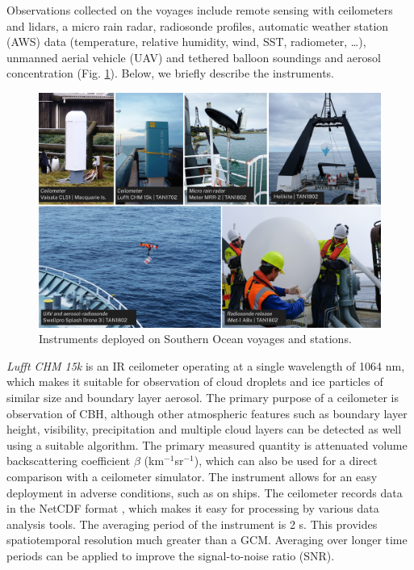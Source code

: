 Observations collected on the voyages include remote sensing with ceilometers and lidars,
a micro rain radar, radiosonde profiles, automatic weather station (AWS) data (temperature, relative humidity,
wind, SST, radiometer, \ldots), unmanned aerial vehicle (UAV) and tethered balloon soundings and
aerosol concentration (Fig. \ref{fig:1:instruments}).
Below, we briefly describe the instruments.

\begin{figure}[t]
\centering
\includegraphics[width=\textwidth]{fig/instruments.jpg}
\caption{
Instruments deployed on Southern Ocean voyages and stations.
}
\label{fig:1:instruments}
\end{figure}

\textit{Lufft CHM 15k} is an IR ceilometer operating at a single wavelength of
1064 nm, which makes it suitable for observation of cloud droplets and
ice particles of similar size and boundary layer aerosol.
The primary purpose of a ceilometer
is observation of CBH, although other atmospheric features
such as boundary layer height, visibility, precipitation and multiple
cloud layers can be detected as well using a suitable algorithm. The
primary measured quantity is attenuated volume backscattering coefficient
$\beta$ (km$^{-1}$sr$^{-1}$), which
can also be used for a direct comparison with a ceilometer simulator.
The instrument allows for an easy deployment
in adverse conditions, such as on ships.
The ceilometer records data in the NetCDF format \citep{rew2006},
which makes it easy
for processing by various data analysis tools.
The averaging period of the instrument is 2 s. This provides spatiotemporal
resolution much greater than a GCM. Averaging over longer time periods can be applied to improve the signal-to-noise ratio (SNR).


